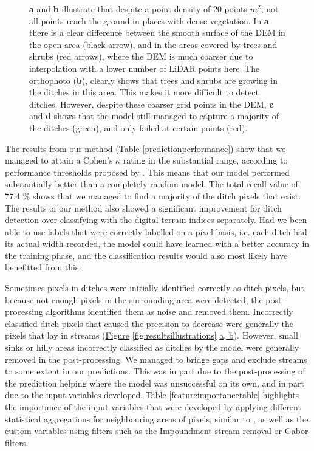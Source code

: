 \documentclass[]{interact}
\theoremstyle{plain}%
\theoremstyle{definition}
\theoremstyle{remark}
\begin{document}
\begin{figure} [!htb]
    \caption{\textbf{a} and \textbf{b} illustrate that despite a point density of 20 points $m^2$, not all points reach the ground in places with dense vegetation. In \textbf{a} there is a clear difference between the smooth surface of the DEM in the open area (black arrow), and in the areas covered by trees and shrubs (red arrows), where the DEM is much coarser due to interpolation with a lower number of LiDAR points here. The orthophoto (\textbf{b}), clearly shows that trees and shrubs are growing in the ditches in this area. This makes it more difficult to detect ditches. However, despite these coarser grid points in the DEM, \textbf{c} and \textbf{d} shows that the model still managed to capture a majority of the ditches (green), and only failed at certain points (red).}
    \label{fig:resultstreesbushes}
\end{figure}

The results from our method (\hyperref[predictionperformance]{Table} \ref{predictionperformance}) show that we managed to attain a Cohen's $\kappa$ rating in the substantial range, according to performance thresholds proposed by \citet{kappaanalysis}. This means that our model performed substantially better than a completely random model. The total recall value of 77.4 \% shows that we managed to find a majority of the ditch pixels that exist. The results of our method also showed a significant improvement for ditch detection over classifying with the digital terrain indices separately. Had we been able to use labels that were correctly labelled on a pixel basis, i.e. each ditch had its actual width recorded, the model could have learned with a better accuracy in the training phase, and the classification results would also most likely have benefitted from this.

Sometimes pixels in ditches were initially identified correctly as ditch pixels, but because not enough pixels in the surrounding area were detected, the post-processing algorithms identified them as noise and removed them. Incorrectly classified ditch pixels that caused the precision to decrease were generally the pixels that lay in streams (\hyperref[fig:resultsillustrations]{Figure} \ref{fig:resultsillustrations} \hyperref[fig:resultsillustrations]{a, b}). However, small sinks or hilly areas incorrectly classified as ditches by the model were generally removed in the post-processing. We managed to bridge gaps and exclude streams to some extent in our predictions. This was in part due to the post-processing of the prediction helping where the model was unsuccessful on its own, and in part due to the input variables developed. \hyperref[featureimportancetable]{Table} \ref{featureimportancetable} highlights the importance of the input variables that were developed by applying different statistical aggregations for neighbouring areas of pixels, similar to \citet{roelens}, as well as the custom variables using filters such as the Impoundment stream removal or Gabor filters.
\end{document}
